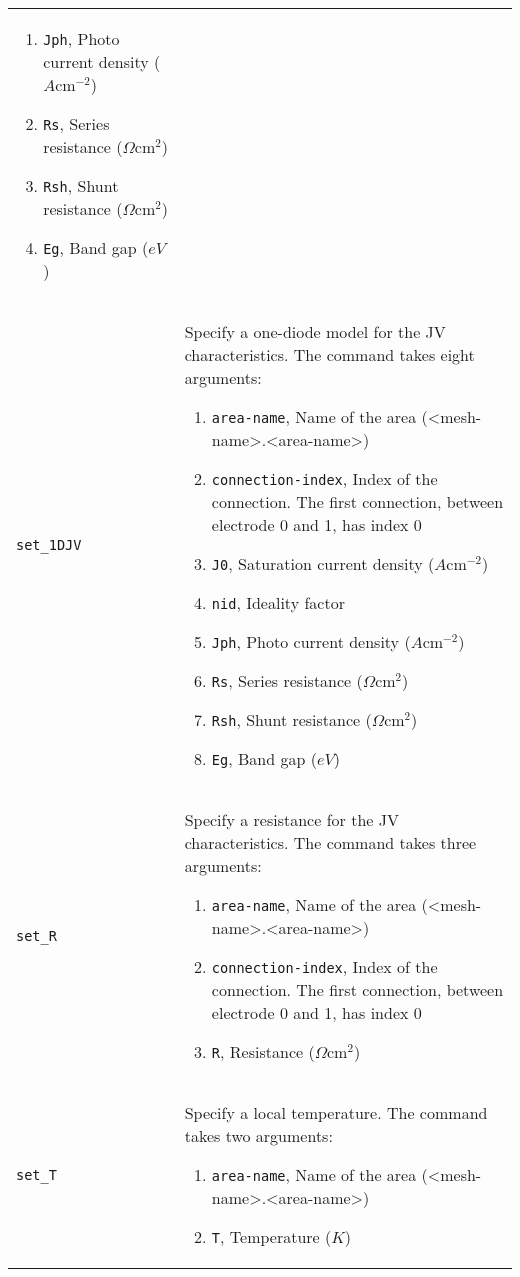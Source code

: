 \documentclass[noshowpacs,preprintnumbers,amsmath,amssymb, letter]{revtex4}
\begin{document}
\begin{longtable}{p{}p{}}
\begin{enumerate}
\item \texttt{Jph}, Photo current density ($A \text{cm}^{-2}$)
\item \texttt{Rs}, Series resistance ($\Omega \text{cm}^2$)
\item \texttt{Rsh}, Shunt resistance ($\Omega \text{cm}^2$)
\item \texttt{Eg}, Band gap ($eV$)
\end{enumerate}\\
\texttt{set\_1DJV}	&  Specify a one-diode model for the JV characteristics. The command takes eight arguments:
\begin{enumerate}
\item \texttt{area-name}, Name of the area (\textless mesh-name\textgreater .\textless area-name\textgreater )
\item \texttt{connection-index}, Index of the connection. The first connection, between electrode 0 and 1,  has index 0
\item \texttt{J0}, Saturation current density ($A \text{cm}^{-2}$)
\item \texttt{nid}, Ideality factor
\item \texttt{Jph}, Photo current density ($A \text{cm}^{-2}$)
\item \texttt{Rs}, Series resistance ($\Omega \text{cm}^2$)
\item \texttt{Rsh}, Shunt resistance ($\Omega \text{cm}^2$)
\item \texttt{Eg}, Band gap ($eV$)
\end{enumerate}\\
\texttt{set\_R}	&  Specify a resistance for the JV characteristics. The command takes three arguments:
\begin{enumerate}
\item \texttt{area-name}, Name of the area (\textless mesh-name\textgreater .\textless area-name\textgreater )
\item \texttt{connection-index}, Index of the connection. The first connection, between electrode 0 and 1,  has index 0
\item \texttt{R}, Resistance ($\Omega \text{cm}^2$)
\end{enumerate}\\
\texttt{set\_T}	&  Specify a local temperature. The command takes two arguments:
\begin{enumerate}
\item \texttt{area-name}, Name of the area (\textless mesh-name\textgreater .\textless area-name\textgreater )
\item \texttt{T}, Temperature ($K$)

\end{enumerate}
\end{longtable}
\end{document}
